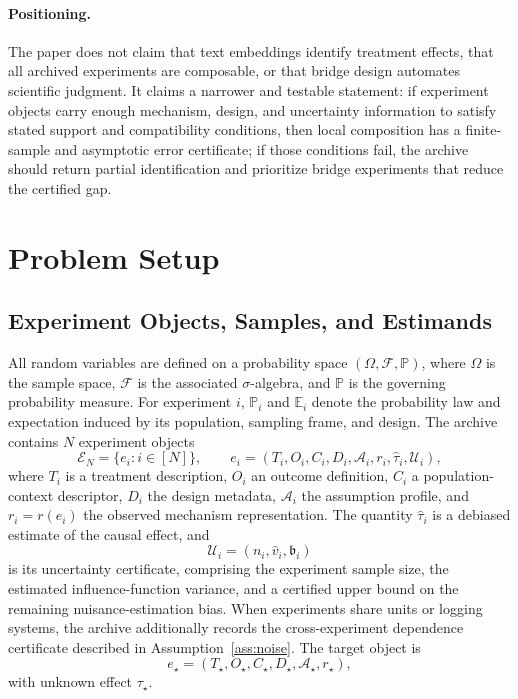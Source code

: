 \documentclass[11pt]{article}
\numberwithin{equation}{section}
\newcommand{\Pbb}{\mathbb P}
\newcommand{\1}{\mathbf 1}
\newcommand{\cA}{\mathcal A}
\newcommand{\cE}{\mathcal E}
\newcommand{\cF}{\mathcal F}
\newcommand{\cU}{\mathcal U}
\begin{document}
\paragraph{Positioning.}
The paper does not claim that text embeddings identify treatment effects, that all archived experiments are composable, or that bridge design automates scientific judgment.  It claims a narrower and testable statement: if experiment objects carry enough mechanism, design, and uncertainty information to satisfy stated support and compatibility conditions, then local composition has a finite-sample and asymptotic error certificate; if those conditions fail, the archive should return partial identification and prioritize bridge experiments that reduce the certified gap.

\section{Problem Setup}
\label{sec:setup}

\subsection{Experiment Objects, Samples, and Estimands}

All random variables are defined on a probability space \((\Omega,\cF,\Pbb)\), where \(\Omega\) is the sample space, \(\mathcal F\) is the associated \(\sigma\)-algebra, and \(\mathbb P\) is the governing probability measure. For experiment \(i\), \(\mathbb P_i\) and \(\mathbb E_i\) denote the probability law and expectation induced by its population, sampling frame, and design.  The archive contains \(N\) experiment objects
\[
  \cE_N=\{e_i:i\in[N]\},\qquad
  e_i=(T_i,O_i,C_i,D_i,\cA_i,r_i,\widehat\tau_i,\cU_i),
\]
where \(T_i\) is a treatment description, \(O_i\) an outcome definition, \(C_i\) a population-context descriptor, \(D_i\) the design metadata, \(\cA_i\) the assumption profile, and \(r_i=r(e_i)\) the observed mechanism representation.  The quantity \(\widehat\tau_i\) is a debiased estimate of the causal effect, and
\[
  \cU_i=(n_i,\widehat v_i,\mathfrak b_i)
\]
is its uncertainty certificate, comprising the experiment sample size, the estimated influence-function variance, and a certified upper bound on the remaining nuisance-estimation bias.  When experiments share units or logging systems, the archive additionally records the cross-experiment dependence certificate described in Assumption~\ref{ass:noise}.  The target object is
\[
  e_\star=(T_\star,O_\star,C_\star,D_\star,\cA_\star,r_\star),
\]
with unknown effect \(\tau_\star\).
\end{document}
